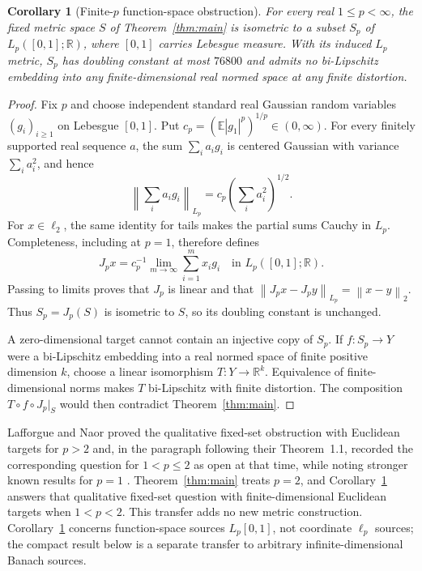 \documentclass[11pt]{article}
\newtheorem{corollary}[theorem]{Corollary}
\newcommand{\R}{\mathbb R}
\newcommand{\norm}[1]{\left\lVert#1\right\rVert}
\begin{document}
\begin{corollary}[Finite-$p$ function-space obstruction]\label{cor:lp}
For every real $1\le p<\infty$, the fixed metric space $S$ of Theorem~\ref{thm:main} is isometric to a subset $S_p$ of $L_p([0,1];\R)$, where $[0,1]$ carries Lebesgue measure. With its induced $L_p$ metric, $S_p$ has doubling constant at most $76800$ and admits no bi-Lipschitz embedding into any finite-dimensional real normed space at any finite distortion.
\end{corollary}
\begin{proof}
Fix $p$ and choose independent standard real Gaussian random variables $(g_i)_{i\ge1}$ on Lebesgue $[0,1]$. Put $c_p=(\mathbb E|g_1|^p)^{1/p}\in(0,\infty)$. For every finitely supported real sequence $a$, the sum $\sum_i a_i g_i$ is centered Gaussian with variance $\sum_i a_i^2$, and hence
\[
 \norm{\sum_i a_i g_i}_{L_p}=c_p\left(\sum_i a_i^2\right)^{1/2}.
\]
For $x\in\ell_2$, the same identity for tails makes the partial sums Cauchy in $L_p$. Completeness, including at $p=1$, therefore defines
\[
 J_p x=c_p^{-1}\lim_{m\to\infty}\sum_{i=1}^m x_i g_i
 \quad\text{in }L_p([0,1];\R).
\]
Passing to limits proves that $J_p$ is linear and that
$\norm{J_p x-J_p y}_{L_p}=\norm{x-y}_2$. Thus $S_p=J_p(S)$ is isometric to $S$, so its doubling constant is unchanged.

A zero-dimensional target cannot contain an injective copy of $S_p$. If $f:S_p\to Y$ were a bi-Lipschitz embedding into a real normed space of finite positive dimension $k$, choose a linear isomorphism $T:Y\to\R^k$. Equivalence of finite-dimensional norms makes $T$ bi-Lipschitz with finite distortion. The composition $T\circ f\circ J_p|_S$ would then contradict Theorem~\ref{thm:main}.
\end{proof}

Lafforgue and Naor proved the qualitative fixed-set obstruction with Euclidean targets for $p>2$ and, in the paragraph following their Theorem~1.1, recorded the corresponding question for $1<p\le2$ as open at that time, while noting stronger known results for $p=1$ \cite[Theorem 1.1 and the following paragraph]{LN}. Theorem~\ref{thm:main} treats $p=2$, and Corollary~\ref{cor:lp} answers that qualitative fixed-set question with finite-dimensional Euclidean targets when $1<p<2$. This transfer adds no new metric construction. Corollary~\ref{cor:lp} concerns function-space sources $L_p[0,1]$, not coordinate $\ell_p$ sources; the compact result below is a separate transfer to arbitrary infinite-dimensional Banach sources.
\end{document}
